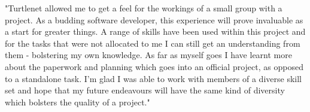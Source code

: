 "Turtlenet allowed me to get a feel for the workings of a small group with a
 project.  As a budding software developer, this experience will prove
 invaluable as a start for greater things.
 A range of skills have been used within this project and for the tasks that
 were not allocated to me I can still get an understanding from them - 
 bolstering my own knowledge.
 As far as myself goes I have learnt more about the paperwork and planning which
 goes into an official project, as opposed to a standalone task.
 I'm glad I was able to work with members of a diverse skill set and hope that
 my future endeavours will have the same kind of diversity which bolsters the
 quality of a project."
